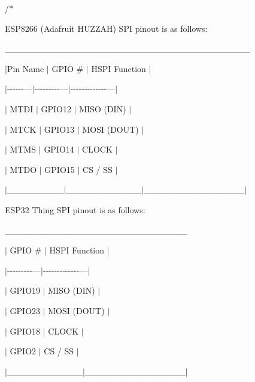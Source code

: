 /$\ast$
\begin{DoxyItemize}
\item ESP8266 (Adafruit HUZZAH) SPI pinout is as follows\+:
\item \+\_\+\+\_\+\+\_\+\+\_\+\+\_\+\+\_\+\+\_\+\+\_\+\+\_\+\+\_\+\+\_\+\+\_\+\+\_\+\+\_\+\+\_\+\+\_\+\+\_\+\+\_\+\+\_\+\+\_\+\+\_\+\+\_\+\+\_\+\+\_\+\+\_\+\+\_\+\+\_\+\+\_\+\+\_\+\+\_\+\+\_\+\+\_\+\+\_\+\+\_\+\+\_\+\+\_\+\+\_\+\+\_\+\+\_\+
\item $\vert$\+Pin Name $\vert$ GPIO \# $\vert$ HSPI Function $\vert$
\item $\vert$-\/-\/-\/-\/-\/-\/---$\vert$-\/-\/-\/-\/-\/-\/-\/-\/-\/---$\vert$-\/-\/-\/-\/-\/-\/-\/-\/-\/-\/-\/-\/-\/---$\vert$
\item $\vert$ MTDI $\vert$ GPIO12 $\vert$ MISO (DIN) $\vert$
\item $\vert$ MTCK $\vert$ GPIO13 $\vert$ MOSI (DOUT) $\vert$
\item $\vert$ MTMS $\vert$ GPIO14 $\vert$ CLOCK $\vert$
\item $\vert$ MTDO $\vert$ GPIO15 $\vert$ CS / SS $\vert$
\item $\vert$\+\_\+\+\_\+\+\_\+\+\_\+\+\_\+\+\_\+\+\_\+\+\_\+\+\_\+$\vert$\+\_\+\+\_\+\+\_\+\+\_\+\+\_\+\+\_\+\+\_\+\+\_\+\+\_\+\+\_\+\+\_\+\+\_\+$\vert$\+\_\+\+\_\+\+\_\+\+\_\+\+\_\+\+\_\+\+\_\+\+\_\+\+\_\+\+\_\+\+\_\+\+\_\+\+\_\+\+\_\+\+\_\+\+\_\+$\vert$
\item 
\item 
\item ESP32 Thing SPI pinout is as follows\+:
\item \+\_\+\+\_\+\+\_\+\+\_\+\+\_\+\+\_\+\+\_\+\+\_\+\+\_\+\+\_\+\+\_\+\+\_\+\+\_\+\+\_\+\+\_\+\+\_\+\+\_\+\+\_\+\+\_\+\+\_\+\+\_\+\+\_\+\+\_\+\+\_\+\+\_\+\+\_\+\+\_\+\+\_\+\+\_\+
\item $\vert$ GPIO \# $\vert$ HSPI Function $\vert$
\item $\vert$-\/-\/-\/-\/-\/-\/-\/-\/-\/---$\vert$-\/-\/-\/-\/-\/-\/-\/-\/-\/-\/-\/-\/-\/---$\vert$
\item $\vert$ GPIO19 $\vert$ MISO (DIN) $\vert$
\item $\vert$ GPIO23 $\vert$ MOSI (DOUT) $\vert$
\item $\vert$ GPIO18 $\vert$ CLOCK $\vert$
\item $\vert$ GPIO2 $\vert$ CS / SS $\vert$
\item $\vert$\+\_\+\+\_\+\+\_\+\+\_\+\+\_\+\+\_\+\+\_\+\+\_\+\+\_\+\+\_\+\+\_\+\+\_\+$\vert$\+\_\+\+\_\+\+\_\+\+\_\+\+\_\+\+\_\+\+\_\+\+\_\+\+\_\+\+\_\+\+\_\+\+\_\+\+\_\+\+\_\+\+\_\+\+\_\+$\vert$

\end{DoxyItemize}

